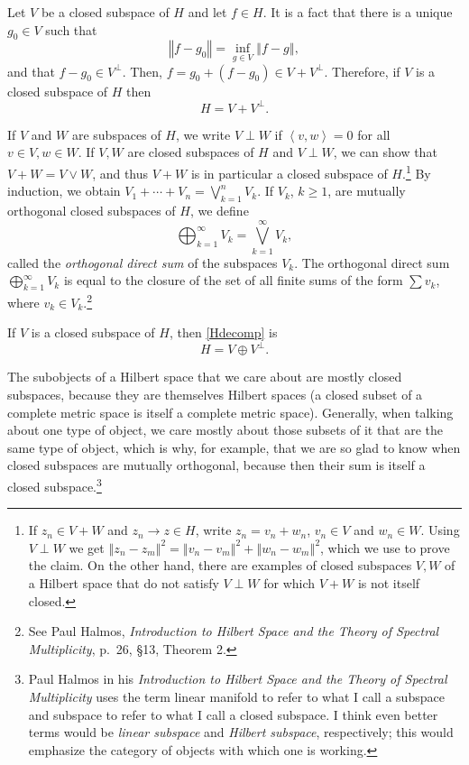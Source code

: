 \documentclass{article}
\newcommand{\inner}[2]{\left\langle #1, #2 \right\rangle}
\newcommand{\norm}[1]{\left\Vert #1 \right\Vert}
\begin{document}
Let $V$ be a closed subspace of $H$ and let $f \in H$. It is a fact that there is a unique $g_0 \in V$ such that 
\[
\norm{f-g_0}=\inf_{g \in V} \norm{f-g},
\]
and that $f - g_0 \in V^\perp$. 
Then, $f=g_0+(f-g_0) \in V+V^\perp$. Therefore, if
$V$ is a closed subspace of $H$ then
\begin{equation}
\label{Hdecomp}
H=V + V^\perp.
\end{equation}

If $V$ and $W$ are subspaces of $H$, we write $V \perp W$ if $\inner{v}{w}=0$ for all $v \in V, w \in W$. If $V,W$ are closed subspaces of $H$ and
$V \perp W$, we
can show that $V+W=V \vee W$, and thus $V+W$ is in particular a closed subspace of $H$.\footnote{If $z_n \in V+W$ and $z_n \to z \in H$, write $z_n=v_n+w_n$,
$v_n \in V$ and $w_n \in W$. Using $V \perp W$ we get $\norm{z_n-z_m}^2=\norm{v_n-v_m}^2+\norm{w_n-w_m}^2$, which we use to
prove the claim. On the other hand, there are examples of closed subspaces $V,W$ of a Hilbert space that do not satisfy $V \perp W$ for
which $V+W$ is not itself closed.}   By induction, we obtain $V_1 + \cdots+V_n = \bigvee_{k=1}^n V_k$. 
If $V_k$, $k \geq 1$, are mutually orthogonal closed subspaces of $H$, we define
\[
\bigoplus_{k=1}^\infty V_k= \bigvee_{k=1}^\infty V_k,
\]
called the  {\em orthogonal direct sum} of the subspaces $V_k$. The orthogonal direct sum $\bigoplus_{k=1}^\infty V_k$ is equal
to the closure of the set of all  finite sums of the form $\sum  v_k$, where $v_k \in V_k$.\footnote{See
Paul
Halmos, {\em Introduction to Hilbert Space and the Theory of Spectral Multiplicity}, p.~26, \S 13, Theorem 2.}

If $V$ is a closed subspace of $H$, then \eqref{Hdecomp} is
\[
H=V \oplus V^\perp.
\]

The subobjects of a Hilbert space that we care about are mostly closed subspaces, because they are themselves Hilbert spaces (a closed subset
of a complete metric space is itself a complete metric space). Generally, when talking about one type of object, we care mostly about those
subsets of it that are the same type of object, which is why, for example, that we are so glad to know when closed subspaces are mutually orthogonal, because
then  their sum is itself a closed subspace.\footnote{Paul
Halmos in his {\em Introduction to Hilbert Space and the Theory of Spectral Multiplicity} uses the term linear manifold to
refer to what I call a  subspace and subspace to refer to what I call a closed subspace. I think even better terms
would be {\em linear subspace} and {\em Hilbert subspace}, respectively; this would emphasize the category of objects with  which one is working.}
\end{document}

